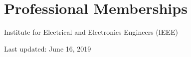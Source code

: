 \documentclass[letterpaper]{article}
\def\footerlink{}
\renewenvironment{itemize}{
  \begin{list}{}{
    \setlength{\leftmargin}{1.5em}
  }
}{
  \end{list}
}
\begin{document}
\section*{Professional Memberships}

\begin{itemize}
  \item Institute for Electrical and Electronics Engineers (IEEE)
\end{itemize}

\bigskip

\begin{center}
  \begin{footnotesize}
    Last updated: June 16, 2019 \\
    \href{\footerlink}{\texttt{\footerlink}}
  \end{footnotesize}
\end{center}
\end{document}
